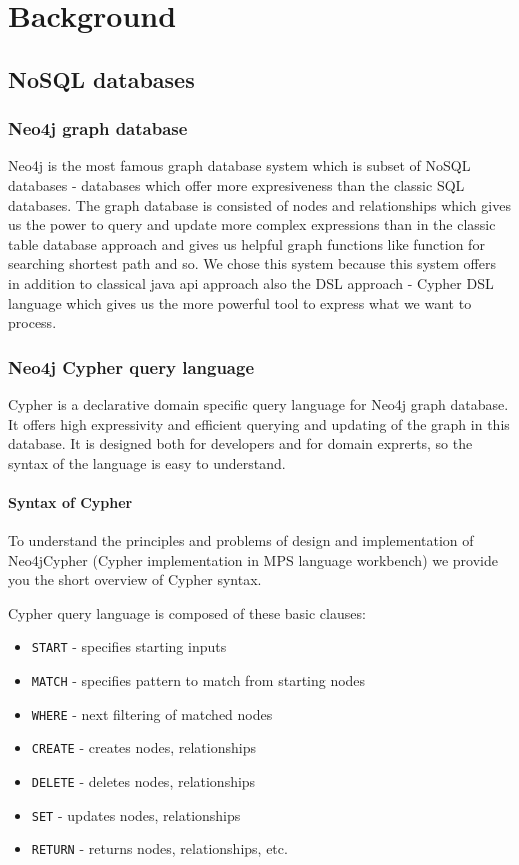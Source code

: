 \chapter{Background}

\section{NoSQL databases}

\subsection{Neo4j graph database}

Neo4j is the most famous graph database system which is subset of NoSQL databases - databases which
offer more expresiveness than the classic SQL databases. The graph database is consisted of nodes
and relationships which gives us the power to query and update more complex expressions than in the
classic table database approach and gives us helpful graph functions like function for
searching shortest path and so. We chose this system because this system offers in addition to
classical java api approach also the DSL approach - Cypher DSL language which gives us the more
powerful tool to express what we want to process.

\subsection{Neo4j Cypher query language}
	
Cypher is a declarative domain specific query language for Neo4j graph database. It offers high
expressivity and efficient querying and updating of the graph in this database. It is designed both
for developers and for domain exprerts, so the syntax of the language is easy to understand.

\subsubsection{Syntax of Cypher}

To understand the principles and problems of design and implementation of Neo4jCypher (Cypher
implementation in MPS language workbench) we provide you the short overview of Cypher syntax.

Cypher query language is composed of these basic clauses:

\begin{itemize}
  \item \texttt{START} - specifies starting inputs
  \item \texttt{MATCH} - specifies pattern to match from starting nodes
  \item \texttt{WHERE} - next filtering of matched nodes
  \item \texttt{CREATE} - creates nodes, relationships
  \item \texttt{DELETE} - deletes nodes, relationships
  \item \texttt{SET} - updates nodes, relationships
  \item \texttt{RETURN} - returns nodes, relationships, etc.
\end{itemize}

